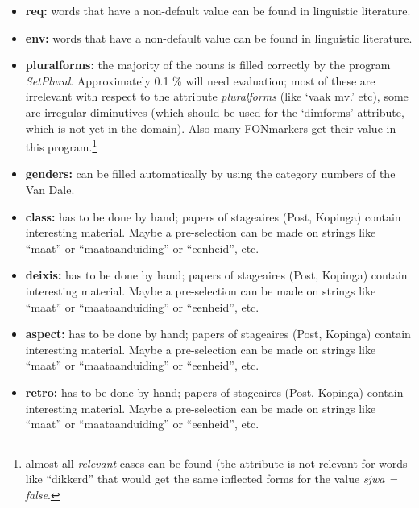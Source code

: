 \begin{itemize}
  \item {\bf req:} words that have a non-default value can be found in 
        linguistic literature.

  \item {\bf env:} words that have a non-default value can be found in 
        linguistic literature.

  \item {\bf pluralforms:} the majority of the nouns is filled correctly by the 
        program {\em SetPlural}. Approximately 0.1 \% will need evaluation; 
        most of these are irrelevant with respect to the attribute {\em 
        pluralforms} (like `vaak mv.' etc), some are irregular diminutives 
        (which should be used for the `dimforms' attribute, which is not yet 
        in the domain). Also many FONmarkers get their value in this 
        program.\footnote{almost all {\em relevant} cases can be found (the 
        attribute is not relevant for words like ``dikkerd'' that would get the 
        same inflected forms for the value {\em sjwa = false}.}

  \item {\bf genders:} can be filled automatically by using the category 
        numbers of the Van Dale.

  \item {\bf class:} has to be done by hand; papers of stageaires (Post,
        Kopinga) contain interesting material.
        Maybe a pre-selection can be made on strings like ``maat'' or 
        ``maataanduiding'' or ``eenheid'', etc.

  \item {\bf deixis:} has to be done by hand; papers of stageaires (Post,
        Kopinga) contain interesting material.
        Maybe a pre-selection can be made on strings like ``maat'' or 
        ``maataanduiding'' or ``eenheid'', etc.

  \item {\bf aspect:} has to be done by hand; papers of stageaires (Post,
        Kopinga) contain interesting material.
        Maybe a pre-selection can be made on strings like ``maat'' or 
        ``maataanduiding'' or ``eenheid'', etc.

  \item {\bf retro:} has to be done by hand; papers of stageaires (Post,
        Kopinga) contain interesting material.
        Maybe a pre-selection can be made on strings like ``maat'' or 
        ``maataanduiding'' or ``eenheid'', etc.


\end{itemize}
